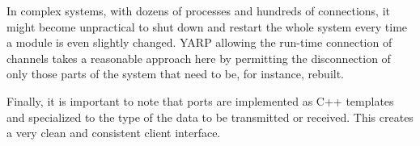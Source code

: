 In complex systems, with dozens of processes and hundreds of connections, it might become
unpractical to shut down and restart the whole system every time a module is even slightly 
changed. YARP allowing the run-time connection of channels takes a reasonable approach
here by permitting the disconnection of only those parts of the system that need to be, 
for instance, rebuilt.

Finally, it is important to note that ports are implemented as C++ templates and 
specialized to the type of the data to be transmitted or received. This creates a very 
clean and consistent client interface.



